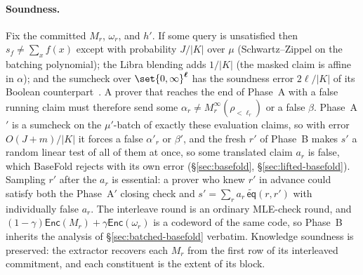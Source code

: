 \documentclass{article}
\theoremstyle{definition}
\newcommand*{\mle}{\widetilde}
\newcommand{\eq}{\mathsf{eq}}
\begin{document}
\paragraph{Soundness.}
Fix the committed $M_r$, $\omega_r$, and $h'$. If some query is unsatisfied then $s_f \ne \sum_x f(x)$ except with probability $J / |K|$ over $\mu$ (Schwartz--Zippel on the batching polynomial); the Libra blending adds $1 / |K|$ (the masked claim is affine in $\alpha$); and the sumcheck over $\set{0, \infty}^{\boldsymbol{\ell}}$ has the soundness error $2 \boldsymbol{\ell} / |K|$ of its Boolean counterpart~\cite[\S 3]{cryptoeprint:2026/762}. A prover that reaches the end of Phase~A with a false running claim must therefore send some $\alpha_r \ne M_r^\infty(\rho_{< \ell_r})$ or a false $\beta$. Phase~A$'$ is a sumcheck on the $\mu'$-batch of exactly these evaluation claims, so with error $O(J + m) / |K|$ it forces a false $\alpha'_r$ or $\beta'$, and the fresh $r'$ of Phase~B makes $s'$ a random linear test of all of them at once, so some translated claim $a_r$ is false, which BaseFold rejects with its own error (\S\ref{sec:basefold}, \S\ref{sec:lifted-basefold}). Sampling $r'$ after the $a_r$ is essential: a prover who knew $r'$ in advance could satisfy both the Phase~A$'$ closing check and $s' = \sum_r a_r\, \mle{\eq}(r, r')$ with individually false $a_r$. The interleave round is an ordinary MLE-check round, and $(1 - \gamma) \textsf{Enc}(M_r) + \gamma \textsf{Enc}(\omega_r)$ is a codeword of the same code, so Phase~B inherits the analysis of \S\ref{sec:batched-basefold} verbatim. Knowledge soundness is preserved: the extractor recovers each $M_r$ from the first row of its interleaved commitment, and each constituent is the extent of its block.
\end{document}
